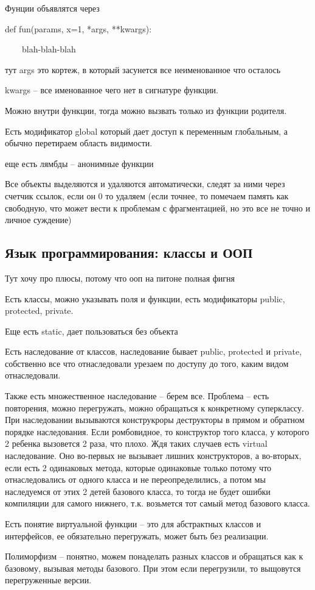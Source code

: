 \documentclass{article}
\begin{document}
Фунции объявлятся через 

def fun(params, x=1, *args, **kwargs):

~~~~blah-blah-blah

тут args это кортеж, в который засунется все неименованное что осталось

kwargs -- все именованное чего нет в сигнатуре функции.

Можно внутри функции, тогда можно вызвать только из функции родителя.

Есть модификатор global который дает доступ к переменным глобальным, а обычно перетираем область видимости.

еще есть лямбды -- анонимные функции

Все объекты выделяются и удаляются автоматически, следят за ними через счетчик ссылок, если он 0 то удаляем (если точнее, то помечаем память как свободную, что может вести к проблемам с фрагментацией, но это все не точно и личное суждение)

\subsection{Язык программирования: классы и ООП}

Тут хочу про плюсы, потому что ооп на питоне полная фигня

Есть классы, можно указывать поля и функции, есть модификаторы public, protected, private.

Еще есть static, дает пользоваться без объекта

Есть наследование от классов, наследование бывает public, protected и private, собственно все что отнаследовали урезаем по доступу до того, каким видом отнаследовали.

Также есть множественное наследование -- берем все. Проблема -- есть повторения, можно перегружать, можно обращаться к конкретному суперклассу. При наследовании вызываются конструкроры деструкторы в прямом и обратном порядке наследования. Если ромбовидное, то конструктор того класса, у которого 2 ребенка вызовется 2 раза, что плохо. Ждя таких случаев есть virtual наследование. Оно во-первых не вызывает лишних конструкторов, а во-вторых, если есть 2 одинаковых метода, которые одинаковые только потому что отнаследовались от одного класса и не переопределились, а потом мы наследуемся от этих 2 детей базового класса, то тогда не будет ошибки компиляции для самого нижнего, т.к. возьмется тот самый метод базового класса.

Есть понятие виртуальной функции -- это для абстрактных классов и интерфейсов, ее обязательно перегружать, может быть без реализации.

Полиморфизм -- понятно, можем понаделать разных классов и обращаться как к базовому, вызывая методы базового. При этом если перегрузили, то выщовутся перегруженные версии.
\end{document}
